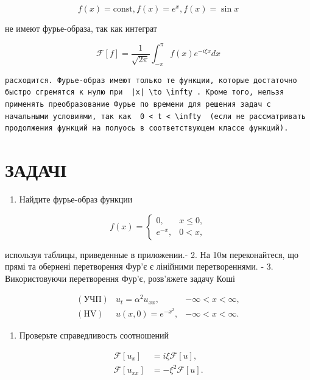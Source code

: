 \documentclass[
  ukrainian,
]{article}
\providecommand{\tightlist}{%
  \setlength{\itemsep}{0pt}\setlength{\parskip}{0pt}}
\begin{document}
\[
f(x) = \text{const},
f(x) = e^x,
f(x) = \sin x
\]

не имеют фурье-образа, так как интеграт

\[
\mathcal{F}[f] = \frac{1}{\sqrt{2\pi}} \int_{-\pi}^{\pi} f(x) e^{-i\xi x} dx
\]

\begin{verbatim}
расходится. Фурье-образ имеют только те функции, которые достаточно быстро сгремятся к нулю при  |x| \to \infty . Кроме того, нельзя применять преобразование Фурье по времени для решения задач с начальными условиями, так как  0 < t < \infty  (если не рассматривать продолжения функций на полуось в соответствующем классе функций).
\end{verbatim}

\section{ЗАДАЧІ}\label{ux437ux430ux434ux430ux447ux456-1}

\begin{enumerate}
\def\labelenumi{\arabic{enumi}.}
\tightlist
\item
  Найдите фурье-образ функции
\end{enumerate}

\[
f(x) =
\begin{cases} 0, & x \leq 0, \\ e^{-x}, & 0 < x, \end{cases}
\]

используя таблицы, приведенные в приложении.- 2. На 10м переконайтеся,
що прямі та обернені перетворення Фур'є є лінійними перетвореннями. - 3.
Використовуючи перетворення Фур'є, розв'яжете задачу Коші

\[
\begin{array}{lll} (\text{УЧП}) & u_t = \alpha^2 u_{xx}, & -\infty < x < \infty, \\ (\text{HV}) & u(x, 0) = e^{-x^2}, & -\infty < x < \infty. \end{array}
\]

\begin{enumerate}
\def\labelenumi{\arabic{enumi}.}
\setcounter{enumi}{3}
\tightlist
\item
  Проверьте справедливость соотношений
\end{enumerate}

\[
\begin{aligned} \mathcal{F}\left[u_{x}\right] &= i\xi \mathcal{F}\left[u\right], \\ \mathcal{F}\left[u_{xx}\right] &= -\xi^{2} \mathcal{F}\left[u\right]. \end{aligned}
\]
\end{document}
